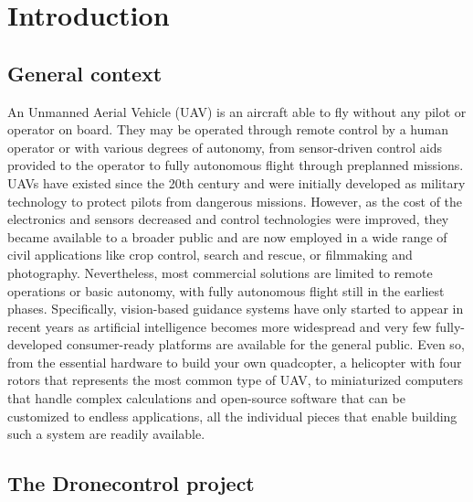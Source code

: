 \cleardoublepage
\chapter{Introduction}
\label{sec:intro}

\section{General context}

An Unmanned Aerial Vehicle (UAV) is an aircraft able to fly without any pilot or operator on board. They may be operated through remote control by a human operator or with various degrees of autonomy, from sensor-driven control aids provided to the operator to fully autonomous flight through preplanned missions.
UAVs have existed since the 20th century and were initially developed as military technology to protect pilots from dangerous missions.
However, as the cost of the electronics and sensors decreased and control technologies were improved, they became available to a broader public and are now employed in a wide range of civil applications like crop control, search and rescue, or filmmaking and photography.
Nevertheless, most commercial solutions are limited to remote operations or basic autonomy, with fully autonomous flight still in the earliest phases.
Specifically, vision-based guidance systems have only started to appear in recent years as artificial intelligence becomes more widespread and very few fully-developed consumer-ready platforms are available for the general public.
Even so,
from the essential hardware to build your own quadcopter, a helicopter with four rotors that represents the most common type of UAV, to miniaturized computers that handle complex calculations and open-source software that can be customized to endless applications,
all the individual pieces that enable building such a system are readily available.

\section{The Dronecontrol project}

